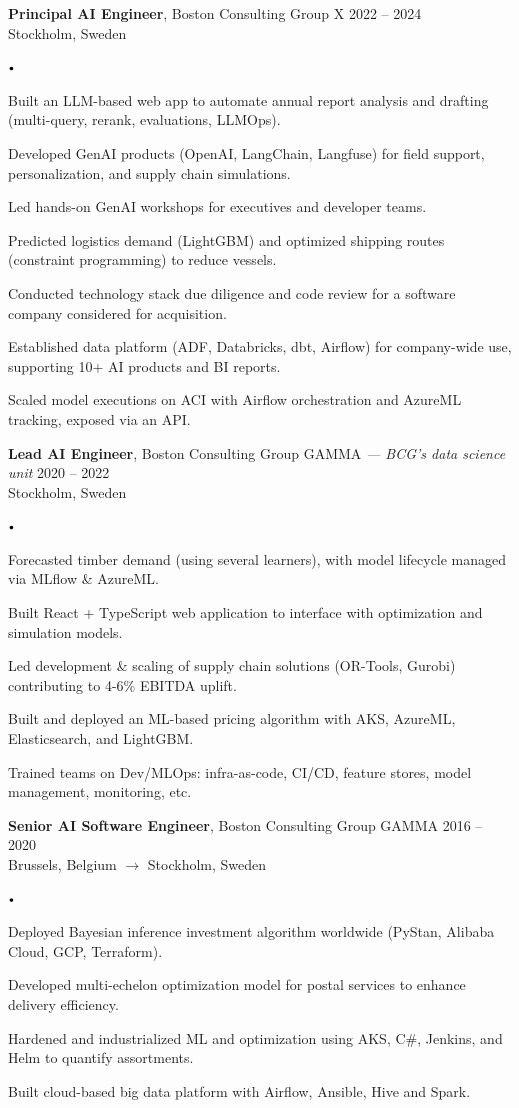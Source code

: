 \documentclass{article}
\newcommand{\experience}[5]{
    \vspace*{2pt}
    \textbf{#1}, #2 \hfill #3 \\ 
    #4 \\
    #5
    \vspace*{2pt}
}
\newcommand{\spacedbullet}{
    $\vcenter{\hbox{\tiny$\bullet$}}$\hspace*{-2pt}
}
\newenvironment{bulletlist}{
    \begin{list}
        {\spacedbullet}{\setlength\leftmargin{10pt} 
        \topsep 0pt \itemsep -2pt}}{\vspace*{4pt}
    \end{list}
}
\begin{document}
\experience{Principal AI Engineer}{Boston Consulting Group X}{2022 -- 2024}{Stockholm, Sweden}
{
    \begin{bulletlist}
        \item Built an LLM-based web app to automate annual report analysis and drafting (multi-query, rerank, evaluations, LLMOps).
        \item Developed GenAI products (OpenAI, LangChain, Langfuse) for field support, personalization, and supply chain simulations.
        \item Led hands-on GenAI workshops for executives and developer teams.
        \item Predicted logistics demand (LightGBM) and optimized shipping routes (constraint programming) to reduce vessels.
        \item Conducted technology stack due diligence and code review for a software company considered for acquisition.
        \item Established data platform (ADF, Databricks, dbt, Airflow) for company-wide use, supporting 10+ AI products and BI reports.
        \item Scaled model executions on ACI with Airflow orchestration and AzureML tracking, exposed via an API.
    \end{bulletlist}
}

\experience{Lead AI Engineer}{Boston Consulting Group GAMMA \textit{— BCG's data science unit}}{2020 -- 2022}{Stockholm, Sweden}
{
    \begin{bulletlist}
        \item Forecasted timber demand (using several learners), with model lifecycle managed via MLflow \& AzureML.
        \item Built React + TypeScript web application to interface with optimization and simulation models.
        \item Led development \& scaling of supply chain solutions (OR-Tools, Gurobi) contributing to 4-6\% EBITDA uplift.
        \item Built and deployed an ML-based pricing algorithm with AKS, AzureML, Elasticsearch, and LightGBM.
        \item Trained teams on Dev/MLOps: infra-as-code, CI/CD, feature stores, model management, monitoring, etc.
    \end{bulletlist}
}

\experience{Senior AI Software Engineer}{Boston Consulting Group GAMMA}{2016 -- 2020}{Brussels, Belgium $\rightarrow$ Stockholm, Sweden}
{
    \begin{bulletlist}
        \item Deployed Bayesian inference investment algorithm worldwide (PyStan, Alibaba Cloud, GCP, Terraform).
        \item Developed multi-echelon optimization model for postal services to enhance delivery efficiency.
        \item Hardened and industrialized ML and optimization using AKS, C\#, Jenkins, and Helm to quantify assortments.
        \item Built cloud-based big data platform with Airflow, Ansible, Hive and Spark.
    \end{bulletlist}
}
\end{document}
